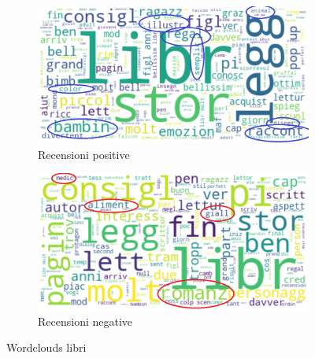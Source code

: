 			\begin{figure} [h]
				\centering
				\begin{subfigure}{0.48\textwidth}
					\includegraphics[width=\textwidth]{Figure/top_positive_books}
					\caption{Recensioni positive}
					\label{fig:top_positive_books}
				\end{subfigure}
				\begin{subfigure}{0.48\textwidth}
					\includegraphics[width=\textwidth]{Figure/top_negative_books}
					\caption{Recensioni negative}
					\label{fig:top_negative_books}
				\end{subfigure}
				\caption{Wordclouds libri}\label{fig:wordclouds_book}
			\end{figure}
			
